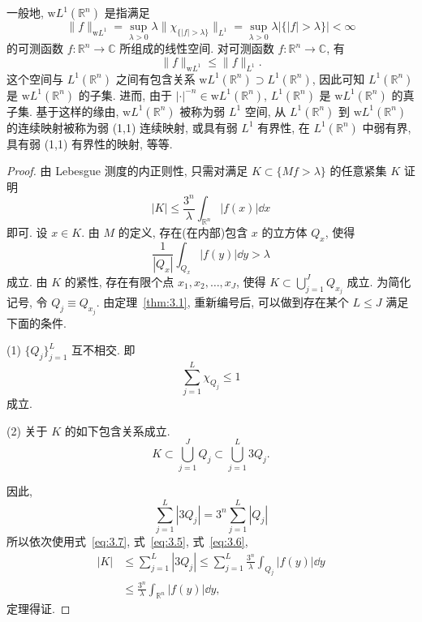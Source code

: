 一般地, $\mathrm{w}L^{1}(\mathbb{R}^{n})$ 是指满足
\[
\|f\|_{\mathrm{w}L^{1}} = \sup_{\lambda > 0}\lambda\|\chi_{\{|f| > \lambda\}}\|_{L^{1}} = \sup_{\lambda > 0}\lambda|\{|f| > \lambda\}| < \infty
\]
的可测函数 $f: \mathbb{R}^{n} \to \mathbb{C}$ 所组成的线性空间. 对可测函数 $f: \mathbb{R}^{n} \to \mathbb{C}$, 有
\[
\|f\|_{\mathrm{w}L^{1}} \leq \|f\|_{L^{1}}.
\]
这个空间与 $L^{1}(\mathbb{R}^{n})$ 之间有包含关系 $\mathrm{w}L^{1}(\mathbb{R}^{n}) \supset L^{1}(\mathbb{R}^{n})$, 因此可知 $L^{1}(\mathbb{R}^{n})$ 是 $\mathrm{w}L^{1}(\mathbb{R}^{n})$ 的子集. 进而, 由于 $|\cdot|^{-n} \in \mathrm{w}L^{1}(\mathbb{R}^{n})$, $L^{1}(\mathbb{R}^{n})$ 是 $\mathrm{w}L^{1}(\mathbb{R}^{n})$ 的真子集. 基于这样的缘由, $\mathrm{w}L^{1}(\mathbb{R}^{n})$ 被称为弱 $L^{1}$ 空间, 从 $L^{1}(\mathbb{R}^{n})$ 到 $\mathrm{w}L^{1}(\mathbb{R}^{n})$ 的连续映射被称为弱 (1,1) 连续映射, 或具有弱 $L^{1}$ 有界性, 在 $L^{1}(\mathbb{R}^{n})$ 中弱有界, 具有弱 (1,1) 有界性的映射, 等等.

\begin{proof}
由 Lebesgue 测度的内正则性, 只需对满足 $K \subset \{Mf > \lambda\}$ 的任意紧集 $K$ 证明
\begin{equation}\tag{3.4}
|K| \leq \frac{3^{n}}{\lambda}\int_{\mathbb{R}^{n}}|f(x)|\dd x
\label{eq:3.4}
\end{equation}
即可. 设 $x \in K$. 由 $M$ 的定义, 存在(在内部)包含 $x$ 的立方体 $Q_{x}$, 使得
\begin{equation}\tag{3.5}
\frac{1}{|Q_{x}|}\int_{Q_{x}}|f(y)|\dd y > \lambda
\label{eq:3.5}
\end{equation}
成立. 由 $K$ 的紧性, 存在有限个点 $x_{1}, x_{2}, \ldots, x_{J}$, 使得 $K \subset \bigcup_{j=1}^{J}Q_{x_{j}}$ 成立. 为简化记号, 令 $Q_{j} \equiv Q_{x_{j}}$. 由定理~\ref{thm:3.1}, 重新编号后, 可以做到存在某个 $L \leq J$ 满足下面的条件.

(1) $\{Q_{j}\}_{j=1}^{L}$ 互不相交. 即
\begin{equation}\tag{3.6}
\sum_{j=1}^{L}\chi_{Q_{j}} \leq 1
\label{eq:3.6}
\end{equation}
成立.

(2) 关于 $K$ 的如下包含关系成立.
\begin{equation}\tag{3.7}
K \subset \bigcup_{j=1}^{J}Q_{j} \subset \bigcup_{j=1}^{L}3Q_{j}.
\label{eq:3.7}
\end{equation}

因此,
\[
\sum_{j=1}^{L}|3Q_{j}| = 3^{n}\sum_{j=1}^{L}|Q_{j}|
\]
所以依次使用式~\eqref{eq:3.7}, 式~\eqref{eq:3.5}, 式~\eqref{eq:3.6},
\begin{align*}
|K| &\leq \sum_{j=1}^{L}|3Q_{j}| \leq \sum_{j=1}^{L}\frac{3^{n}}{\lambda}\int_{Q_{j}}|f(y)|\dd y \\
&\leq \frac{3^{n}}{\lambda}\int_{\mathbb{R}^{n}}|f(y)|\dd y,
\end{align*}
定理得证.
\end{proof}

